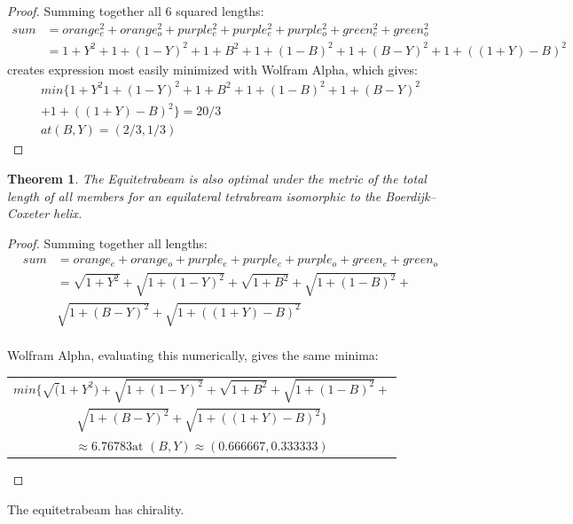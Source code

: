 \documentclass[11pt]{article}
\newtheorem{theorem}{Theorem}
\begin{document}
\begin{proof}
  Summing together all 6 squared lengths:
\begin{align*}
  sum &= orange_e^2 + orange_o^2 + purple_e^2 + purple_e^2 + purple_o^2 + green_e^2 + green_o^2 \\
   &= 1 + Y^2 + 1 + (1-Y)^2 +  1 + B^2 +  1+ (1-B)^2 + 1 + (B - Y)^2 + 1 + ((1+Y) - B)^2 
\end{align*}
  creates expression most easily minimized with Wolfram Alpha, which gives:
\begin{align*}
min\{1 + Y^2 1 + (1 - Y)^2 + 1 + B^2 + 1 + (1 - B)^2 + 1 + (B - Y)^2 \\
  + 1 + ((1 + Y) - B)^2\} = 20/3 \\
at (B, Y) = (2/3, 1/3)
\end{align*}
  
\end{proof}

\begin{theorem}
  The Equitetrabeam is also optimal under the metric of the total length of all members 
  for an equilateral tetrabream isomorphic to the Boerdijk--Coxeter helix.
\end{theorem}

\begin{proof}
  Summing together all lengths:
  \begin{align*}
  sum &= orange_e + orange_o + purple_e + purple_e + purple_o + green_e + green_o \\    
  &= \sqrt{1 + Y^2} + \sqrt{1 + (1-Y)^2} + \sqrt{1 + B^2} + \sqrt{1+ (1-B)^2} + \\
  & \sqrt{1 + (B - Y)^2} +  \sqrt{1 + ((1+Y) - B)^2} \\
  \end{align*} 

  Wolfram Alpha, evaluating this numerically, gives the same minima:
  
  \begin{tabular}{c}    
$  min\{\sqrt(1 + Y^2) + \sqrt{1 + (1 - Y)^2} + \sqrt{1 + B^2} + \sqrt{1 + (1 - B)^2} + $\\
    $  \sqrt{1 + (B - Y)^2} + \sqrt{1 + ((1 + Y) - B)^2}\} $ \\
    $ \approx 6.76783 \text{at } (B, Y) \approx (0.666667, 0.333333) $
  \end{tabular}

  
\end{proof}

The equitetrabeam has chirality.
\end{document}
